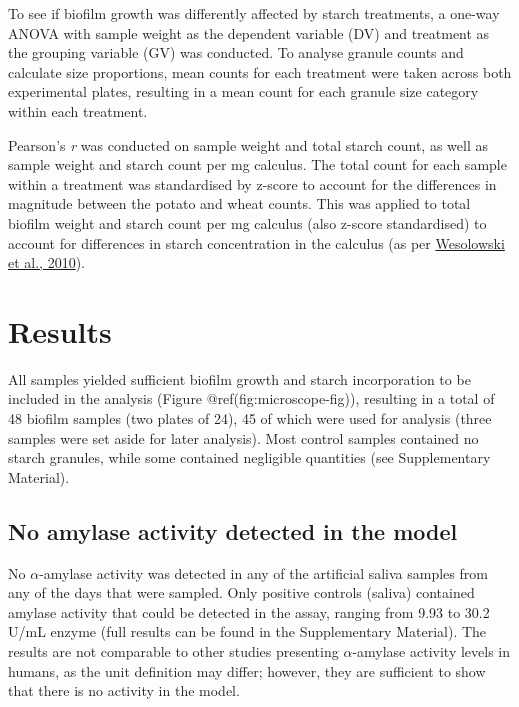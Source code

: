 \documentclass[
  letterpaper,
]{book}
\begin{document}
To see if biofilm growth was differently affected by starch treatments,
a one-way ANOVA with sample weight as the dependent variable (DV) and
treatment as the grouping variable (GV) was conducted. To analyse
granule counts and calculate size proportions, mean counts for each
treatment were taken across both experimental plates, resulting in a
mean count for each granule size category within each treatment.

Pearson's \emph{r} was conducted on sample weight and total starch
count, as well as sample weight and starch count per mg calculus. The
total count for each sample within a treatment was standardised by
z-score to account for the differences in magnitude between the potato
and wheat counts. This was applied to total biofilm weight and starch
count per mg calculus (also z-score standardised) to account for
differences in starch concentration in the calculus (as per
\protect\hyperlink{ref-wesolowskiEvaluatingMicrofossil2010}{Wesolowski
et al., 2010}).

\hypertarget{results-1}{%
\section{Results}\label{results-1}}

All samples yielded sufficient biofilm growth and starch incorporation
to be included in the analysis (Figure @ref(fig:microscope-fig)),
resulting in a total of 48 biofilm samples (two plates of 24), 45 of
which were used for analysis (three samples were set aside for later
analysis). Most control samples contained no starch granules, while some
contained negligible quantities (see Supplementary Material).

\hypertarget{no-amylase-activity-detected-in-the-model}{%
\subsection{No amylase activity detected in the
model}\label{no-amylase-activity-detected-in-the-model}}

No \(\alpha\)-amylase activity was detected in any of the artificial
saliva samples from any of the days that were sampled. Only positive
controls (saliva) contained amylase activity that could be detected in
the assay, ranging from 9.93 to 30.2 U/mL enzyme (full results can be
found in the Supplementary Material). The results are not comparable to
other studies presenting \(\alpha\)-amylase activity levels in humans,
as the unit definition may differ; however, they are sufficient to show
that there is no activity in the model.
\end{document}

